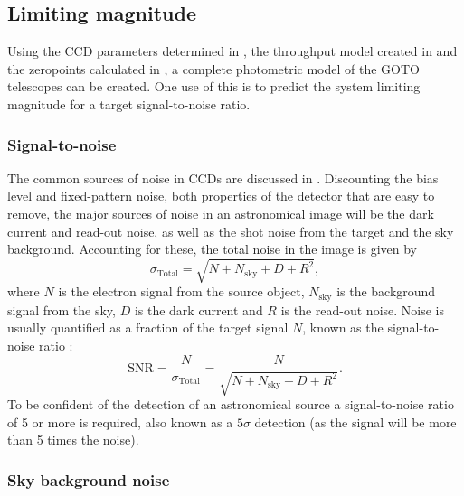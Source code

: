 \subsection{Limiting magnitude}
\label{sec:lim_mag}
\begin{colsection}

Using the CCD parameters determined in , the throughput model created in  and the zeropoints calculated in , a complete photometric model of the GOTO telescopes can be created. One use of this is to predict the system limiting magnitude for a target signal-to-noise ratio.

\subsubsection{Signal-to-noise}

The common sources of noise in CCDs are discussed in . Discounting the bias level and fixed-pattern noise, both properties of the detector that are easy to remove, the major sources of noise in an astronomical image will be the dark current and read-out noise, as well as the shot noise from the target and the sky background. Accounting for these, the total noise in the image is given by
%
\begin{equation}
    \sigma_\text{Total} = \sqrt{N + N_\text{sky} + D + R^2},
    \label{eq:total_noise}
\end{equation}
%
where $N$ is the electron signal from the source object, $N_\text{sky}$ is the background signal from the sky, $D$ is the dark current and $R$ is the read-out noise. Noise is usually quantified as a fraction of the target signal $N$, known as the signal-to-noise ratio :
%
\begin{equation}
    \text{SNR} = \frac{N}{\sigma_\text{Total}} = \frac{N}{\sqrt{N + N_\text{sky} + D + R^2}}.
    \label{eq:snr}
\end{equation}
%
To be confident of the detection of an astronomical source a signal-to-noise ratio of 5 or more is required, also known as a $5\sigma$ detection (as the signal will be more than 5 times the noise).

\newpage

\subsubsection{Sky background noise}


\end{colsection}

